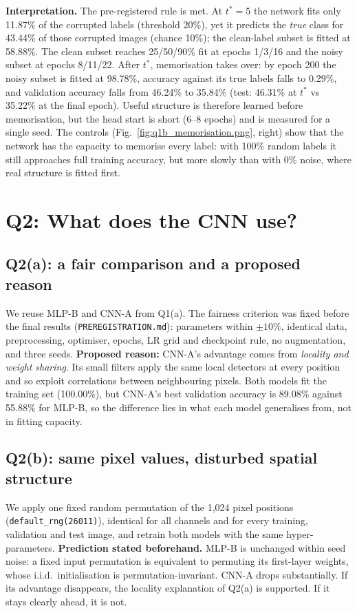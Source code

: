 \documentclass[10pt,twocolumn,letterpaper]{article}
\newcommand{\todo}[1]{\textcolor{red}{[TODO: #1]}}
\newcommand{\tab}[1]{\IfFileExists{tables/#1.tex}{}{\todo{run make\_tables.py: #1}}}
\begin{document}
\tab{tab_q1b}

\textbf{Interpretation.} The pre-registered rule is met. At $t^*=5$ the network fits only 11.87\% of the corrupted labels (threshold 20\%), yet it predicts the \emph{true} class for 43.44\% of those corrupted images (chance 10\%); the clean-label subset is fitted at 58.88\%. The clean subset reaches 25/50/90\% fit at epochs 1/3/16 and the noisy subset at epochs 8/11/22. After $t^*$, memorisation takes over: by epoch 200 the noisy subset is fitted at 98.78\%, accuracy against its true labels falls to 0.29\%, and validation accuracy falls from 46.24\% to 35.84\% (test: 46.31\% at $t^*$ vs 35.22\% at the final epoch). Useful structure is therefore learned before memorisation, but the head start is short (6--8 epochs) and is measured for a single seed. The controls (Fig.~\ref{fig:q1b_memorisation.png}, right) show that the network has the capacity to memorise every label: with 100\% random labels it still approaches full training accuracy, but more slowly than with 0\% noise, where real structure is fitted first.

\section{Q2: What does the CNN use?}
\subsection{Q2(a): a fair comparison and a proposed reason}
We reuse MLP-B and CNN-A from Q1(a). The fairness criterion was fixed before the final results
(\texttt{PREREGISTRATION.md}): parameters within $\pm10\%$, identical data, preprocessing, optimiser,
epochs, LR grid and checkpoint rule, no augmentation, and three seeds. \textbf{Proposed reason:} CNN-A's
advantage comes from \emph{locality and weight sharing}. Its small filters apply the same local detectors
at every position and so exploit correlations between neighbouring pixels. Both models fit the training set (100.00\%), but CNN-A's best validation accuracy is 89.08\% against 55.88\% for MLP-B, so the difference lies in what each model generalises from, not in fitting capacity.

\subsection{Q2(b): same pixel values, disturbed spatial structure}
We apply one fixed random permutation of the 1,024 pixel positions (\texttt{default\_rng(26011)}),
identical for all channels and for every training, validation and test image, and retrain both models
with the same hyper-parameters. \textbf{Prediction stated beforehand.} MLP-B is unchanged within seed
noise: a fixed input permutation is equivalent to permuting its first-layer weights, whose i.i.d.\
initialisation is permutation-invariant. CNN-A drops substantially. If its advantage disappears, the
locality explanation of Q2(a) is supported. If it stays clearly ahead, it is not.
\end{document}
